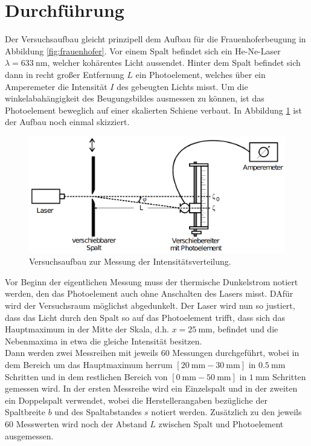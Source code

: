 \section{Durchführung}
\label{sec:Durchführung}
Der Versuchsaufbau gleicht prinzipell dem Aufbau für die Frauenhoferbeugung in Abbildung \ref{fig:frauenhofer}. Vor einem Spalt 
befindet sich ein He-Ne-Laser $\lambda=\SI{633}{\nano\metre}$, welcher kohärentes Licht aussendet. Hinter dem Spalt befindet sich dann in 
recht großer Entfernung $L$ ein Photoelement, welches über ein Amperemeter die Intensität $I$ des gebeugten Lichts misst. Um die 
winkelabahängigkeit des Beugungsbildes ausmessen zu können, ist das Photoelement beweglich auf einer skalierten Schiene verbaut.
In Abbildung \ref{fig:aufbau} ist der Aufbau noch einmal skizziert.
\begin{figure}[H]
    \centering
    \includegraphics[scale = 0.35]{pictures/aufbau.png}
    \caption{Versuchsaufbau zur Messung der Intensitätsverteilung. \cite{AP01}}
    \label{fig:aufbau}
\end{figure}

\noindent
Vor Beginn der eigentlichen Messung muss der thermische Dunkelstrom notiert werden, den das Photoelement auch ohne Anschalten des Lasers
misst. DAfür wird der Versuchsraum möglichst abgedunkelt. Der Laser wird nun so justiert, dass das Licht durch den Spalt so auf das Photoelement trifft, 
dass sich das Hauptmaximum in der Mitte der Skala, d.h. $x=\SI{25}{\milli\metre}$, befindet und die Nebenmaxima in etwa die gleiche Intensität besitzen. 
\\\noindent
Dann werden zwei Messreihen 
mit jeweils $\num{60}$ Messungen durchgeführt, wobei in dem Bereich um das Hauptmaximum herrum $[\SI{20}{\milli\metre}-\SI{30}{\milli\metre}]$
in $\SI{0.5}{\milli\metre}$ Schritten und in dem restlichen Bereich von $[\SI{0}{\milli\metre}-\SI{50}{\milli\metre}]$ in $\SI{1}{\milli\metre}$
Schritten gemessen wird. In der ersten Messreihe wird ein Einzelspalt und in der zweiten ein Doppelspalt verwendet, wobei die 
Herstellerangaben bezügliche der Spaltbreite $b$ und des Spaltabstandes $s$ notiert werden. Zusätzlich zu den jeweils $\num{60}$ Messwerten 
wird noch der Abstand $L$ zwischen Spalt und Photoelement ausgemessen.  